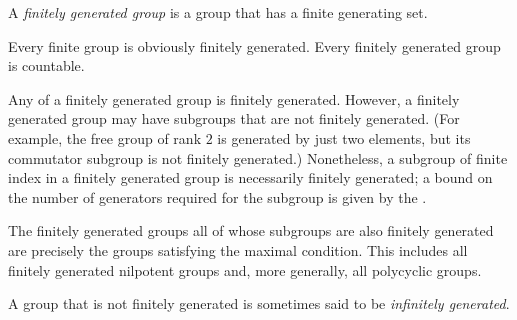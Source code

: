 \documentclass[12pt]{article}
\begin{document}

A \emph{finitely generated group} is a group that has a finite generating set.

Every finite group is obviously finitely generated.
Every finitely generated group is countable.

Any 
of a finitely generated group is finitely generated.
However, a finitely generated group may have subgroups
that are not finitely generated.
(For example, the free group of rank $2$ is generated by just two elements,
but its commutator subgroup is not finitely generated.)
Nonetheless, a subgroup of finite index in a finitely generated group
is necessarily finitely generated;
a bound on the number of generators required for the subgroup is given by
the .

The finitely generated groups
all of whose subgroups are also finitely generated
are precisely the groups satisfying the maximal condition.
This includes all finitely generated nilpotent groups and,
more generally, all polycyclic groups.

A group that is not finitely generated
is sometimes said to be \emph{infinitely generated}.

\end{document}
